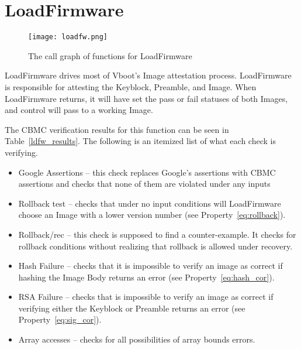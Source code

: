 \section{LoadFirmware}

\begin{figure}[!htbp]
  \centering
  \texttt{[image: loadfw.png]}
  \caption[LoadFirmware Call Graph]{The call graph of functions for LoadFirmware}\label{fig:loadfw}
\end{figure}

LoadFirmware drives most of Vboot's Image attestation process.
LoadFirmware is responsible for attesting the Keyblock, Preamble, and Image.
When LoadFirmware returns, it will have set the pass or fail statuses of both Images, and control will pass to a working Image.

The CBMC verification results for this function can be seen in Table~\ref{ldfw_results}. 
The following is an itemized list of what each check is verifying.

\begin{itemize}
 \item  Google Assertions -- this check replaces Google's assertions with CBMC assertions and checks that none of them are violated under any inputs
 \item  Rollback test -- checks that under no input conditions will LoadFirmware choose an Image with a lower version number (see Property~\ref{eq:rollback}).
 \item  Rollback/rec  -- this check is supposed to find a counter-example. It checks for rollback conditions without realizing that rollback is allowed under recovery. 
 \item  Hash Failure -- checks that it is impossible to verify an image as correct if hashing the Image Body returns an error (see Property~\ref{eq:hash_cor}).
 \item  RSA Failure -- checks that is impossible to verify an image as correct if verifying either the Keyblock or Preamble returns an error (see Property~\ref{eq:sig_cor}).
 \item  Array accesses -- checks for all possibilities of array bounds errors.
\end{itemize}

